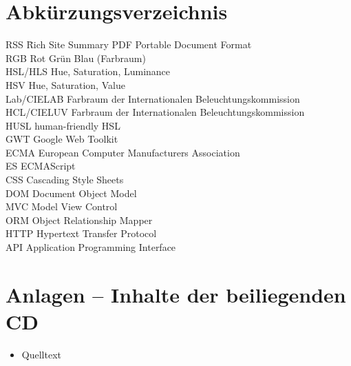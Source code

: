 \documentclass[12pt,twoside]{book}
\let\cleardoublepage\clearpage
\newcounter{savepage}
\begin{document}
\newpage

\setcounter{page}{\thesavepage}
\printbibliography
\cleardoublepage

\listoffigures
\cleardoublepage
{}
\chapter*{Abkürzungsverzeichnis}

\begin{tabbing}
    RSS \hspace{3cm} \= Rich  Site Summary \kill
    PDF \> Portable Document Format \\
    RGB \> Rot Grün Blau  (Farbraum) \\
    HSL/HLS \> Hue, Saturation, Luminance \\
    HSV \> Hue, Saturation, Value \\
    Lab/CIELAB \> Farbraum der Internationalen Beleuchtungskommission \\
    HCL/CIELUV \> Farbraum der Internationalen Beleuchtungskommission \\
    HUSL \> human-friendly HSL \\
    GWT \> Google Web Toolkit \\
    ECMA \> European Computer Manufacturers Association \\
    ES \> ECMAScript \\
    CSS \> Cascading Style Sheets \\
    DOM \> Document Object Model \\
    MVC \> Model View Control \\
    ORM \> Object Relationship Mapper \\
    HTTP \> Hypertext Transfer Protocol \\
    API \> Application Programming Interface
\end{tabbing}
\cleardoublepage

\chapter*{Anlagen – Inhalte der beiliegenden CD}
\begin{itemize}
	\item Quelltext
\end{itemize}
\end{document}
